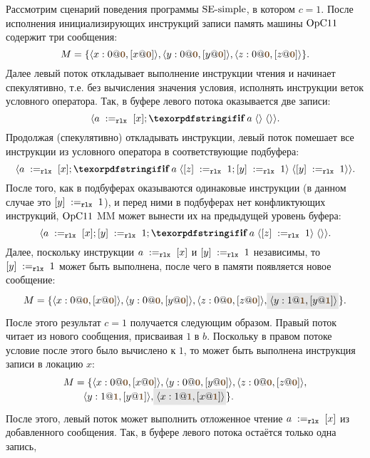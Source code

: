 Рассмотрим сценарий поведения программы ${\rm SE\text{-}simple}$, в котором $c = 1$.
После исполнения инициализирующих инструкций записи память машины $\mathrm{OpC11}$ содержит три сообщения:
\[
M = \{\angled{x:0@\tstamp{0}, [x@\tstamp{0}]}, \angled{y:0@\tstamp{0},[y@\tstamp{0}]},
      \angled{z:0@\tstamp{0},[z@\tstamp{0}]}\}.
\]
Далее левый поток откладывает выполнение инструкции чтения и начинает
спекулятивно, т.е. без вычисления значения условия, исполнять инструкции
веток условного оператора.
Так, в буфере левого потока оказывается две записи:
\[\angled{\readInstParam{\rlx}{a}{x}; \kw{if} \; a \; \angled{} \; \angled{}}.\]
Продолжая (спекулятивно) откладывать инструкции, левый поток помешает все инструкции из
условного оператора в соответствующие подбуфера:
\[\angled{\readInstParam{\rlx}{a}{x};
  \kw{if} \; a \; \angled{\writeInstParam{\rlx}{z}{1}; \writeInstParam{\rlx}{y}{1}} \;
  \angled{\writeInstParam{\rlx}{y}{1}}}.\]
После того, как в подбуферах оказываются одинаковые инструкции
(в данном случае это $[y] \;:=_{\mathtt{rlx}}\;1$), и перед ними в подбуферах нет
конфликтующих инструкций, $\mathrm{OpC11}$ MM может вынести их на предыдущей уровень буфера:
\[\angled{\readInstParam{\rlx}{a}{x}; \writeInstParam{\rlx}{y}{1};
  \kw{if} \; a \; \angled{\writeInstParam{\rlx}{z}{1}} \;
  \angled{} }.\]
Далее, поскольку инструкции $a \;:=_{\mathtt{rlx}}\;[x]$ и $[y] \;:=_{\mathtt{rlx}}\;1$
независимы, то $[y] \;:=_{\mathtt{rlx}}\;1$
может быть выполнена, после чего в памяти появляется новое сообщение:
\[
\begin{array}{@{}l@{}}
M = \{\angled{x:0@\tstamp{0}, [x@\tstamp{0}]}, \angled{y:0@\tstamp{0},[y@\tstamp{0}]},
      \angled{z:0@\tstamp{0},[z@\tstamp{0}]}, \graybox{\angled{y:1@\tstamp{1},[y@\tstamp{1}]}}\}.
\end{array}
\]
После этого результат $c = 1$ получается следующим образом.
Правый поток читает из нового сообщения, присваивая $1$ в $b$.
Поскольку в правом потоке условие после этого было вычислено к $1$,
то может быть выполнена инструкция записи в локацию $x$:
\[
\begin{array}{@{}l@{}}
M = \{\angled{x:0@\tstamp{0}, [x@\tstamp{0}]}, \angled{y:0@\tstamp{0},[y@\tstamp{0}]}, \angled{z:0@\tstamp{0},[z@\tstamp{0}]}, \\
\qquad \angled{y:1@\tstamp{1},[y@\tstamp{1}]}, \graybox{\angled{x:1@\tstamp{1},[x@\tstamp{1}]}}\}.
\end{array}
\]
После этого, левый поток может выполнить отложенное чтение $a \;:=_{\mathtt{rlx}}\;[x]$ из добавленного сообщения.
Так, в буфере левого потока остаётся только одна запись,
